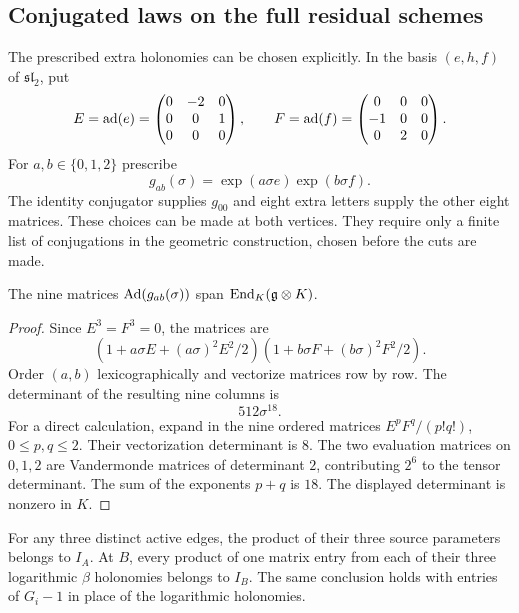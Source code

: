 \subsection{Conjugated laws on the full residual schemes}

The prescribed extra holonomies can be chosen explicitly.  In the basis
$(e,h,f)$ of $\mathfrak{sl}_2$, put
\[
 E=\operatorname{ad}(e)=\begin{pmatrix}0&-2&0\\0&0&1\\0&0&0\end{pmatrix},
 \qquad
 F=\operatorname{ad}(f)=\begin{pmatrix}0&0&0\\-1&0&0\\0&2&0\end{pmatrix}.
\]
For $a,b\in\{0,1,2\}$ prescribe
\begin{equation}
\label{eq:vertex-explicit-background}
 g_{ab}(\sigma)=\exp(a\sigma e)\exp(b\sigma f).
\end{equation}
The identity conjugator supplies $g_{00}$ and eight extra letters supply
the other eight matrices.  These choices can be made at both vertices.
They require only a finite list of conjugations in the geometric
construction, chosen before the cuts are made.

\begin{lemma}
\label{lem:vertex-adjoint-span}
The nine matrices $\operatorname{Ad}(g_{ab}(\sigma))$ span $\operatorname{End}_K(\mathfrak{g}\otimes K)$.
\end{lemma}

\begin{proof}
Since $E^3=F^3=0$, the matrices are
\[
 (1+a\sigma E+(a\sigma)^2E^2/2)
 (1+b\sigma F+(b\sigma)^2F^2/2).
\]
Order $(a,b)$ lexicographically and vectorize matrices row by row.  The
determinant of the resulting nine columns is
\[
 512\sigma^{18}.
\]
For a direct calculation, expand in the nine ordered matrices
$E^pF^q/(p!q!)$, $0\leq p,q\leq2$.  Their vectorization determinant is
$8$.  The two evaluation matrices on $0,1,2$ are Vandermonde matrices
of determinant $2$, contributing $2^6$ to the tensor determinant.  The
sum of the exponents $p+q$ is $18$.  The displayed determinant is
nonzero in $K$.
\end{proof}

\begin{lemma}
\label{lem:vertex-triple-ideals}
For any three distinct active edges, the product of their three source
parameters belongs to $I_A$.  At $B$, every product of one matrix entry
from each of their three logarithmic $\beta$ holonomies belongs to
$I_B$.  The same conclusion holds with entries of $G_i-1$ in place of
the logarithmic holonomies.
\end{lemma}

